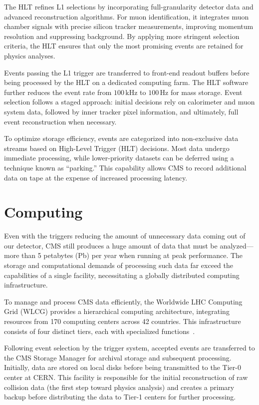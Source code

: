 The HLT refines L1 selections by incorporating full-granularity detector data and advanced reconstruction algorithms. For muon identification, it integrates muon chamber signals with precise silicon tracker measurements, improving momentum resolution and suppressing background. By applying more stringent selection criteria, the HLT ensures that only the most promising events are retained for physics analyses.

Events passing the L1 trigger are transferred to front-end readout buffers before being processed by the HLT on a dedicated computing farm. The HLT software further reduces the event rate from $100\,\mathrm{kHz}$ to $100\,\mathrm{Hz}$ for mass storage. Event selection follows a staged approach: initial decisions rely on calorimeter and muon system data, followed by inner tracker pixel information, and ultimately, full event reconstruction when necessary.

To optimize storage efficiency, events are categorized into non-exclusive data streams based on High-Level Trigger (HLT) decisions. Most data undergo immediate processing, while lower-priority datasets can be deferred using a technique known as ``parking.'' This capability allows CMS to record additional data on tape at the expense of increased processing latency.

\section{Computing}

Even with the triggers reducing the amount of unnecessary data coming out of our detector, CMS still produces a huge amount of data that must be analyzed---more than 5 petabytes (Pb) per year when running at peak performance. The storage and computational demands of processing such data far exceed the capabilities of a single facility, necessitating a globally distributed computing infrastructure.

To manage and process CMS data efficiently, the Worldwide LHC Computing Grid (WLCG) provides a hierarchical computing architecture, integrating resources from 170 computing centers across 42 countries. This infrastructure consists of four distinct tiers, each with specialized functions~\cite{Cittolin:578006, SHIERS2007219, Bayatyan:838359}.

Following event selection by the trigger system, accepted events are transferred to the CMS Storage Manager for archival storage and subsequent processing. Initially, data are stored on local disks before being transmitted to the Tier-0 center at CERN. This facility is responsible for the initial reconstruction of raw collision data (the first step toward physics analysis) and creates a primary backup before distributing the data to Tier-1 centers for further processing.

